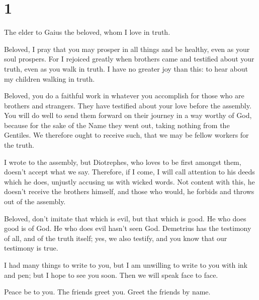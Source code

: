 \hypertarget{section}{%
\section{1}\label{section}}

 The elder to Gaius the beloved, whom I love in truth.

 Beloved, I pray that you may prosper in all things and be
healthy, even as your soul prospers.  For I rejoiced greatly
when brothers came and testified about your truth, even as you walk in
truth.  I have no greater joy than this: to hear about my
children walking in truth.

 Beloved, you do a faithful work in whatever you accomplish
for those who are brothers and strangers.  They have
testified about your love before the assembly. You will do well to send
them forward on their journey in a way worthy of God, 
because for the sake of the Name they went out, taking nothing from the
Gentiles.  We therefore ought to receive such, that we may
be fellow workers for the truth.

 I wrote to the assembly, but Diotrephes, who loves to be
first amongst them, doesn't accept what we say.  Therefore,
if I come, I will call attention to his deeds which he does, unjustly
accusing us with wicked words. Not content with this, he doesn't receive
the brothers himself, and those who would, he forbids and throws out of
the assembly.

 Beloved, don't imitate that which is evil, but that which
is good. He who does good is of God. He who does evil hasn't seen God.
 Demetrius has the testimony of all, and of the truth
itself; yes, we also testify, and you know that our testimony is true.

 I had many things to write to you, but I am unwilling to
write to you with ink and pen;  but I hope to see you soon.
Then we will speak face to face.

Peace be to you. The friends greet you. Greet the friends by name.
